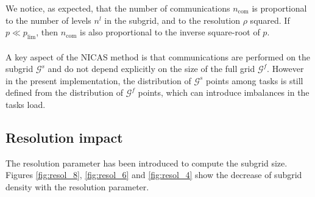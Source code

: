 \documentclass[12pt]{scrartcl}
\begin{document}
We notice, as expected, that the number of communications $n_\mathrm{com}$ is proportional to the number of levels $n^l$ in the subgrid, and to the resolution $\rho$ squared. If $p \ll p_\mathrm{lim}$, then $n_\mathrm{com}$ is also proportional to the inverse square-root of $p$.\\
$  $\\
A key aspect of the NICAS method is that communications are performed on the subgrid $\mathcal{G}^s$ and do not depend explicitly on the size of the full grid $\mathcal{G}^f$. However in the present implementation, the distribution of $\mathcal{G}^s$ points among tasks is still defined from the distribution of $\mathcal{G}^f$ points, which can introduce imbalances in the tasks load.

\subsection{Resolution impact}
The resolution parameter has been introduced to compute the subgrid size. Figures \ref{fig:resol_8}, \ref{fig:resol_6} and \ref{fig:resol_4} show the decrease of subgrid density with the resolution parameter. 
\end{document}
